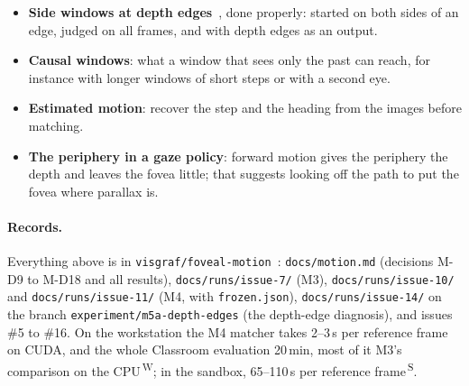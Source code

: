 \documentclass[11pt,a4paper]{article}
\newcommand{\code}[1]{\texttt{\small #1}}
\newcommand{\src}[1]{\textsuperscript{\,#1}}
\newcommand{\WS}{\src{W}}   %
\newcommand{\SB}{\src{S}}   %
\begin{document}
\begin{itemize}
\item \textbf{Side windows at depth edges}~\cite{kanadeokutomi,fusiello}, done properly: started on both sides of an
  edge, judged on all frames, and with depth edges as an output.
\item \textbf{Causal windows}: what a window that sees only the past can reach, for instance with longer windows of
  short steps or with a second eye.
\item \textbf{Estimated motion}: recover the step and the heading from the images before matching.
\item \textbf{The periphery in a gaze policy}: forward motion gives the periphery the depth and leaves the fovea little;
  that suggests looking off the path to put the fovea where parallax is.
\end{itemize}

\paragraph{Records.} Everything above is in \code{visgraf/foveal-motion}~\cite{fm}: \code{docs/motion.md} (decisions
M-D9 to M-D18 and all results), \code{docs/runs/issue-7/} (M3), \code{docs/runs/issue-10/} and \code{docs/runs/issue-11/}
(M4, with \code{frozen.json}), \code{docs/runs/issue-14/} on the branch \code{experiment/m5a-depth-edges} (the depth-edge
diagnosis), and issues \#5 to \#16. On the workstation the M4 matcher takes 2--3\,s per reference frame on CUDA, and the
whole Classroom evaluation 20\,min, most of it M3's comparison on the CPU\WS; in the sandbox, 65--110\,s per reference
frame\SB.
\end{document}
